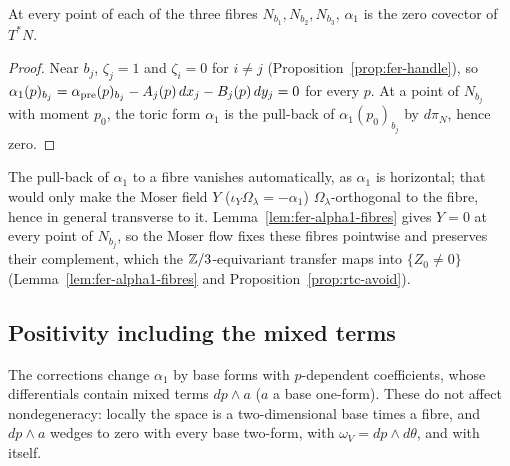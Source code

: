 \begin{lemma}\label{lem:fer-alpha1-fibres}
At every point of each of the three fibres $N_{b_1},N_{b_2},N_{b_3}$, $\alpha_1$ is the zero covector of $T^*N$.
\end{lemma}

\begin{proof}
Near $b_j$, $\zeta_j=1$ and $\zeta_i=0$ for $i\ne j$ (Proposition~\ref{prop:fer-handle}), so $\alpha_1(p)_{b_j}=\alpha_{\rm pre}(p)_{b_j}-A_j(p)\,dx_j-B_j(p)\,dy_j=0$ for every $p$. At a point of $N_{b_j}$ with moment $p_0$, the toric form $\alpha_1$ is the pull-back of $\alpha_1(p_0)_{b_j}$ by $d\pi_N$, hence zero.
\end{proof}

\begin{remark}\label{rem:fer-covector}
The pull-back of $\alpha_1$ to a fibre vanishes automatically, as $\alpha_1$ is horizontal; that would only make
the Moser field $Y$ ($\iota_Y\Omega_\lambda=-\alpha_1$) $\Omega_\lambda$-orthogonal to the fibre, hence in general transverse to it. Lemma~\ref{lem:fer-alpha1-fibres} gives $Y=0$ at every point of $N_{b_j}$, so the Moser flow fixes these fibres
pointwise and preserves their complement, which the $\mathbb{Z}/3$-equivariant transfer maps into $\{Z_0\ne0\}$
(Lemma~\ref{lem:fer-alpha1-fibres} and Proposition~\ref{prop:rtc-avoid}).
\end{remark}

\subsection{Positivity including the mixed terms}\label{sec:fer-positivity}

The corrections change $\alpha_1$ by base forms with $p$-dependent coefficients, whose differentials contain mixed terms $dp\wedge a$ ($a$ a base one-form). These do not affect nondegeneracy: locally the space is a two-dimensional base times a fibre, and $dp\wedge a$ wedges to zero with every base two-form, with $\omega_V=dp\wedge d\theta$, and with itself.

